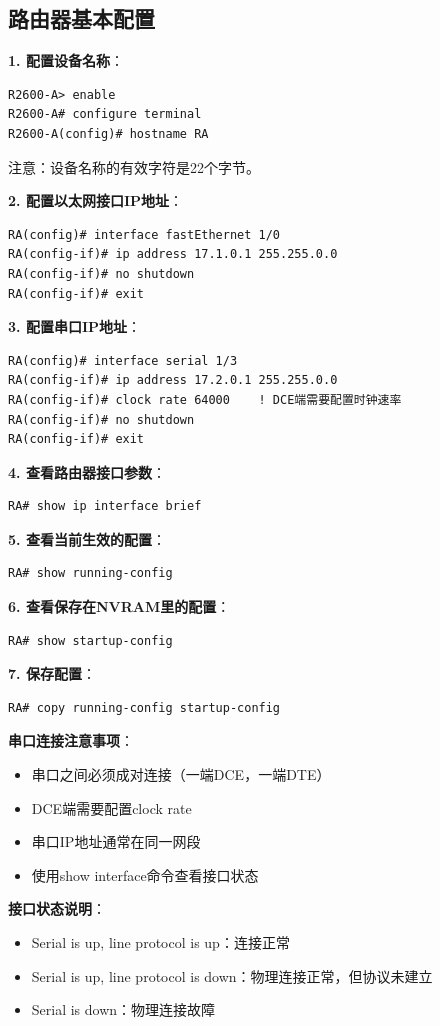 \documentclass[12pt,a4paper]{ctexart}
\begin{document}
\subsection{路由器基本配置}

\begin{cmdbox}
\textbf{1. 配置设备名称}：
\begin{lstlisting}
R2600-A> enable
R2600-A# configure terminal
R2600-A(config)# hostname RA
\end{lstlisting}
注意：设备名称的有效字符是22个字节。

\textbf{2. 配置以太网接口IP地址}：
\begin{lstlisting}
RA(config)# interface fastEthernet 1/0
RA(config-if)# ip address 17.1.0.1 255.255.0.0
RA(config-if)# no shutdown
RA(config-if)# exit
\end{lstlisting}

\textbf{3. 配置串口IP地址}：
\begin{lstlisting}
RA(config)# interface serial 1/3
RA(config-if)# ip address 17.2.0.1 255.255.0.0
RA(config-if)# clock rate 64000    ! DCE端需要配置时钟速率
RA(config-if)# no shutdown
RA(config-if)# exit
\end{lstlisting}

\textbf{4. 查看路由器接口参数}：
\begin{lstlisting}
RA# show ip interface brief
\end{lstlisting}

\textbf{5. 查看当前生效的配置}：
\begin{lstlisting}
RA# show running-config
\end{lstlisting}

\textbf{6. 查看保存在NVRAM里的配置}：
\begin{lstlisting}
RA# show startup-config
\end{lstlisting}

\textbf{7. 保存配置}：
\begin{lstlisting}
RA# copy running-config startup-config
\end{lstlisting}
\end{cmdbox}

\begin{keybox}
\textbf{串口连接注意事项}：

\begin{itemize}[itemsep=0pt]
    \item 串口之间必须成对连接（一端DCE，一端DTE）
    \item DCE端需要配置clock rate
    \item 串口IP地址通常在同一网段
    \item 使用show interface命令查看接口状态
\end{itemize}

\textbf{接口状态说明}：
\begin{itemize}[itemsep=0pt]
    \item Serial is up, line protocol is up：连接正常
    \item Serial is up, line protocol is down：物理连接正常，但协议未建立
    \item Serial is down：物理连接故障
\end{itemize}
\end{keybox}
\end{document}
